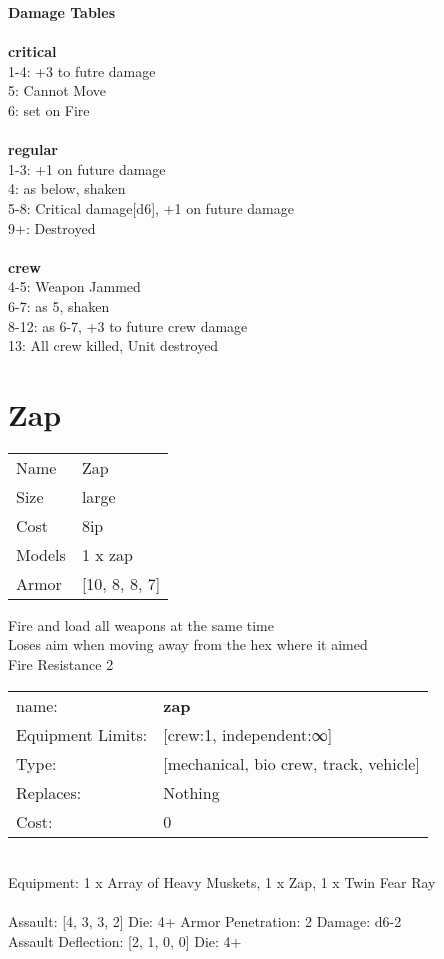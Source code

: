 {\bf Damage Tables} \\
\ \\ {\bf critical } \\
1-4: +3 to futre damage \\
5: Cannot Move \\
6: set on Fire \\
\ \\ {\bf regular } \\
1-3: +1 on future damage \\
4: as below, shaken \\
5-8: Critical damage[d6], +1 on future damage \\
9+: Destroyed \\
\ \\ {\bf crew } \\
4-5: Weapon Jammed \\
6-7: as 5, shaken \\
8-12: as 6-7, +3 to future crew damage \\
13: All crew killed, Unit destroyed \\










\pagebreak\pagebreak

\section{ Zap }

\begin{tabular}{ll}
  Name & Zap \\
  Size & large\\
  Cost & 8ip\\
  Models & 1 x zap\\
  Armor & [10, 8, 8, 7]\\
\end{tabular}

\noindent Fire and load all weapons at the same time\\ 
Loses aim when moving away from the hex where it aimed\\ 
Fire Resistance 2\\ 


\noindent
\begin{tabular}{ll}
name: &{\bf zap } \\
Equipment Limits: &[crew:1, independent:∞] \\
Type: &[mechanical, bio crew, track, vehicle] \\
Replaces: &Nothing \\
Cost: & 0\\
\end{tabular}
\ \\
Equipment: 1 x Array of Heavy Muskets, 1 x Zap, 1 x Twin Fear Ray \\
\ \\
Assault: [4, 3, 3, 2] Die: 4+ Armor Penetration: 2 Damage: d6-2 \\
Assault Deflection: [2, 1, 0, 0] Die: 4+\\
\indent  
\ \\

